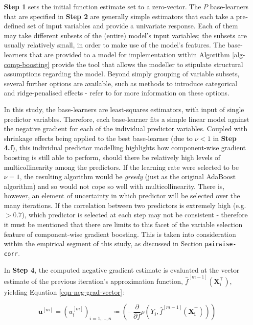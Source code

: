 \documentclass{article}
\begin{document}
\textbf{Step 1} sets the initial function estimate set to a zero-vector. The $P$ base-learners that are specified in \textbf{Step 2} are generally simple estimators that each take a pre-defined set of input variables and provide a univariate response. Each of them may take different subsets of the (entire) model's input variables; the subsets are usually relatively small, in order to make use of the model's features. The base-learners that are provided to a model for implementation within Algorithm \eqref{alg-comp-boosting} provide the tool that allows the modeller to stipulate structural assumptions regarding the model. Beyond simply grouping of variable subsets, several further options are available, such as methods to introduce categorical and ridge-penalised effects - refer to \cite{Hofner2012} for more information on these options.

In this study, the base-learners are least-squares estimators, with input of single predictor variables. Therefore, each base-learner fits a simple linear model against the negative gradient for each of the individual predictor variables. Coupled with shrinkage effects being applied to the best base-learner (due to $\nu < 1$ in \textbf{Step 4.f}), this individual predictor modelling highlights how component-wise gradient boosting is still able to perform, should there be relatively high levels of multicollinearity among the predictors. If the learning rate were selected to be $\nu = 1$, the resulting algorithm would be \emph{greedy} (just as the original AdaBoost algorithm) and so would not cope so well with multicollinearity. There is, however, an element of uncertainty in which predictor will be selected over the many iterations. If the correlation between two predictors is extremely high (e.g. $> 0.7$), which predictor is selected at each step may not be consistent - therefore it must be mentioned that there are limits to this facet of the variable selection feature of component-wise gradient boosting. This is taken into consideration within the empirical segment of this study, as discussed in Section \texttt{pairwise-corr}.

In \textbf{Step 4}, the computed negative gradient estimate is evaluated at the vector estimate of the previous iteration's approximation function, $\hat f^{[m-1]} \left( \mathbf{X}_{i}^\top \right)$, yielding Equation \eqref{eqn-neg-grad-vector}:

\begin{equation}
  \mathbf{u}^{[m]} = \left( u_{i}^{[m]} \right)_{i = 1, …, n} \coloneqq \left( - \frac{\partial}{\partial f}\rho\left(Y_i, \hat f^{[m-1]} \left( \mathbf{X_i^\top} \right) \right) \right)
  \label{eqn-neg-grad-vector}
\end{equation}
\end{document}
